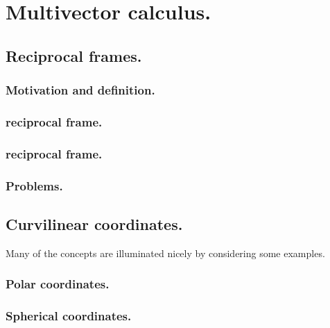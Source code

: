 %
%
\chapter{Multivector calculus.}
   \section{Reciprocal frames.}
      \subsection{Motivation and definition.}
         
         
      \subsection{ reciprocal frame.}
         
      \subsection{ reciprocal frame.}
         
      \subsection{Problems.}
         
         
   \section{Curvilinear coordinates.}
      
      

      Many of the concepts are illuminated nicely by considering some examples.

      \subsection{Polar coordinates.}
         

      \subsection{Spherical coordinates.}
         

